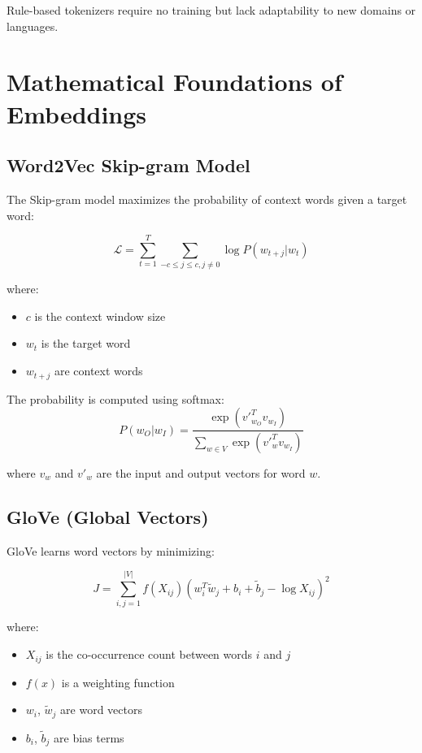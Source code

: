 \documentclass{article}
\begin{document}
Rule-based tokenizers require no training but lack adaptability to new domains or languages.

\section{Mathematical Foundations of Embeddings}

\subsection{Word2Vec Skip-gram Model}
The Skip-gram model maximizes the probability of context words given a target word:

\begin{equation*}
\mathcal{L} = \sum_{t=1}^T \sum_{-c \leq j \leq c, j \neq 0} \log P(w_{t+j}|w_t)
\end{equation*}

where:
\begin{itemize}
\item $c$ is the context window size
\item $w_t$ is the target word
\item $w_{t+j}$ are context words
\end{itemize}

The probability is computed using softmax:
\begin{equation*}
P(w_O|w_I) = \frac{\exp(v'_{w_O}^T v_{w_I})}{\sum_{w \in V} \exp(v'_w^T v_{w_I})}
\end{equation*}

where $v_w$ and $v'_w$ are the input and output vectors for word $w$.

\subsection{GloVe (Global Vectors)}
GloVe learns word vectors by minimizing:

\begin{equation*}
J = \sum_{i,j=1}^{|V|} f(X_{ij})(w_i^T \tilde{w}_j + b_i + \tilde{b}_j - \log X_{ij})^2
\end{equation*}

where:
\begin{itemize}
\item $X_{ij}$ is the co-occurrence count between words $i$ and $j$
\item $f(x)$ is a weighting function
\item $w_i$, $\tilde{w}_j$ are word vectors
\item $b_i$, $\tilde{b}_j$ are bias terms
\end{itemize}
\end{document}
